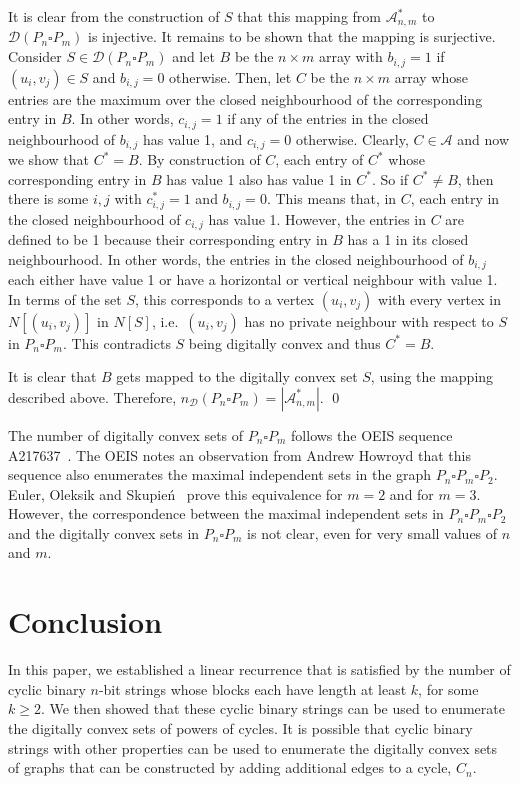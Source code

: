 \documentclass[12pt]{article}
\begin{document}
It is clear from the construction of $S$ that this mapping from $\mathscr{A}^*_{n,m}$ to $\mathscr{D}(P_n\square P_m)$ is injective. It remains to be shown that the mapping is surjective. Consider $S\in \mathscr{D}(P_n\square P_m)$ and let $B$ be the $n\times m$ array with $b_{i,j}=1$ if $(u_i,v_j)\in S$ and $b_{i,j}=0$ otherwise. Then, let $C$ be the $n\times m$ array whose entries are the maximum over the closed neighbourhood of the corresponding entry in $B$. In other words, $c_{i,j}=1$ if any of the entries in the closed neighbourhood of $b_{i,j}$ has value 1, and $c_{i,j}=0$ otherwise. Clearly, $C\in\mathscr{A}$ and now we show that $C^*=B$. By construction of $C$, each entry of $C^*$ whose corresponding entry in $B$ has value 1 also has value 1 in $C^*$. So if $C^* \neq B$, then there is some $i,j$ with $c^*_{i,j}=1$ and $b_{i,j}=0$. This means that, in $C$, each entry in the closed neighbourhood of $c_{i,j}$ has value 1. However, the entries in $C$ are defined to be 1 because their corresponding entry in $B$ has a 1 in its closed neighbourhood. In other words, the entries in the closed neighbourhood of $b_{i,j}$ each either have value 1 or have a horizontal or vertical neighbour with value 1. In terms of the set $S$, this corresponds to a vertex $(u_i,v_j)$ with every vertex in $N[(u_i,v_j)]$ in $N[S]$, i.e.~$(u_i,v_j)$ has no private neighbour with respect to $S$ in $P_n\square P_m$. This contradicts $S$ being digitally convex and thus $C^*=B$. 

It is clear that $B$ gets mapped to the digitally convex set $S$, using the mapping described above. Therefore, $n_\mathscr{D}(P_n\square P_m) = |\mathscr{A}^*_{n,m}|$. \qed

The number of digitally convex sets of $P_n\square P_m$ follows the OEIS sequence A217637~\cite{oeis1}. The OEIS notes an observation from Andrew Howroyd that this sequence also enumerates the maximal independent sets in the graph $P_n \square P_m \square P_2$. Euler, Oleksik and Skupie\'n~\cite{euler} prove this equivalence for $m=2$ and for $m=3$. However, the correspondence between the maximal independent sets in $P_n\square P_m\square P_2$ and the digitally convex sets in $P_n\square P_m$ is not clear, even for very small values of $n$ and $m$. 

\section{Conclusion}

In this paper, we established a linear recurrence that is satisfied by the number of cyclic binary $n$-bit strings whose blocks each have length at least $k$, for some $k\geq 2$. We then showed that these cyclic binary strings can be used to enumerate the digitally convex sets of powers of cycles. It is possible that cyclic binary strings with other properties can be used to enumerate the digitally convex sets of graphs that can be constructed by adding additional edges to a cycle, $C_n$. 
\end{document}
